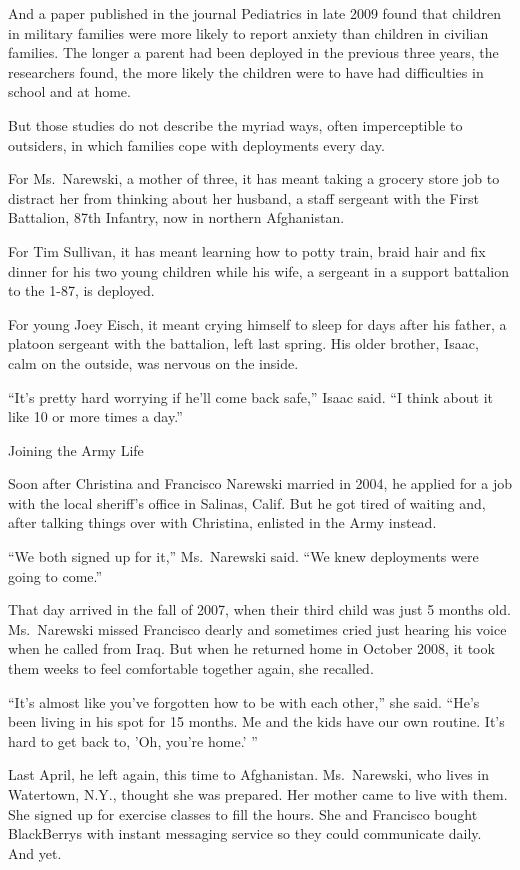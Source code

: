 ﻿\documentclass[12pt]{article}
\begin{document}
And a paper published in the journal Pediatrics in late 2009 found that children in military
families were more likely to report anxiety than children in civilian families. The longer a parent
had been deployed in the previous three years, the researchers found, the more likely the children
were to have had difficulties in school and at home.

But those studies do not describe the myriad ways, often imperceptible to outsiders, in which
families cope with deployments every day.

For Ms.~Narewski, a mother of three, it has meant taking a grocery store job to distract her from
thinking about her husband, a staff sergeant with the First Battalion, 87th Infantry, now in
northern Afghanistan.

For Tim Sullivan, it has meant learning how to potty train, braid hair and fix dinner for his two
young children while his wife, a sergeant in a support battalion to the 1-87, is deployed.

For young Joey Eisch, it meant crying himself to sleep for days after his father, a platoon sergeant
with the battalion, left last spring. His older brother, Isaac, calm on the outside, was nervous on
the inside.

``It's pretty hard worrying if he'll come back safe,'' Isaac said. ``I think about it like 10 or
more times a day.''

Joining the Army Life

Soon after Christina and Francisco Narewski married in 2004, he applied for a job with the local
sheriff's office in Salinas, Calif. But he got tired of waiting and, after talking things over with
Christina, enlisted in the Army instead.

``We both signed up for it,'' Ms.~Narewski said. ``We knew deployments were going to come.''

That day arrived in the fall of 2007, when their third child was just 5 months old. Ms.~Narewski
missed Francisco dearly and sometimes cried just hearing his voice when he called from Iraq. But
when he returned home in October 2008, it took them weeks to feel comfortable together again, she
recalled.

``It's almost like you've forgotten how to be with each other,'' she said. ``He's been living in his
spot for 15 months. Me and the kids have our own routine. It's hard to get back to, 'Oh, you're
home.' ''

Last April, he left again, this time to Afghanistan. Ms.~Narewski, who lives in Watertown, N.Y.,
thought she was prepared. Her mother came to live with them. She signed up for exercise classes to
fill the hours. She and Francisco bought BlackBerrys with instant messaging service so they could
communicate daily. And yet.
\end{document}
